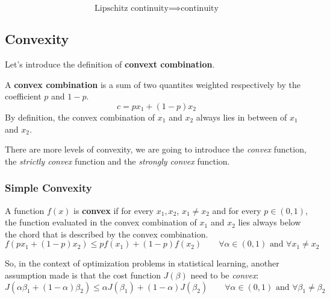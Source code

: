 \begin{theorem}
    \[
        \text{Lipschitz continuity} \implies \text{continuity}
    \]
\end{theorem}
\subsection{Convexity}
Let's introduce the definition of \textbf{convext combination}.
\begin{definition}
    A \textbf{convex combination} is a sum of two quantites weighted respectively by the coefficient $p$ and $1-p$.
    \[
        c = p x_1 + (1-p) x_2
    \]
    By definition, the convex combination of $x_1$ and $x_2$ always lies in between of $x_1$ and $x_2$.
\end{definition}

There are more levels of convexity, we are going to introduce the \textit{convex} function, the \textit{strictly convex} function and the \textit{strongly convex} function.
\subsubsection*{Simple Convexity}

\begin{definition}
    A function $f(x)$ is \textbf{convex} if for every $x_1, x_2$, $x_1 \neq x_2$ and for every $p \in (0,1)$, the function evaluated in the convex combination of $x_1$ and $x_2$ lies always below the chord that is described by the convex combination.
    \[
        f(p x_1 + (1-p) x_2) \leq p f(x_1) + (1-p) f(x_2) \qquad \forall \alpha \in (0,1) \text{ and } \forall x_1 \neq x_2
    \]
\end{definition}

So, in the context of optimization problems in statistical learning, another assumption made is that the cost function $J(\beta)$ need to be \textit{convex}:
\[
    J(\alpha \beta_1 + (1-\alpha)\beta_2) \leq \alpha J(\beta_1) + (1-\alpha)J(\beta_2) \qquad  \forall \alpha \in (0,1) \text{ and } \forall \beta_1 \neq \beta_2
\]

